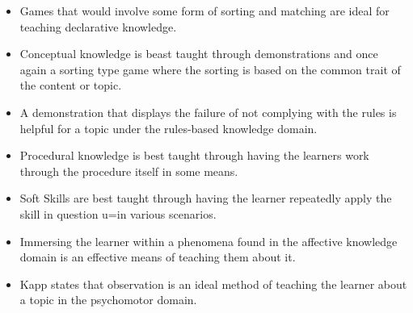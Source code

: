 \documentclass[conference]{IEEEtran}
\begin{document}
\begin{itemize}
\item
Games that would involve some form of sorting and matching are ideal for teaching declarative knowledge.
\item
Conceptual knowledge is beast taught through demonstrations and once again a sorting type game where the sorting is based on the common trait of the content or topic.
\item
A demonstration that displays the failure of not complying with the rules is helpful for a topic under the rules-based knowledge domain.
\item
Procedural knowledge is best taught through having the learners work through the procedure itself in some means.
\item
Soft Skills are best taught through having the learner repeatedly apply the skill in question u=in various scenarios.
\item
Immersing the learner within a phenomena found in the affective knowledge domain is an effective means of teaching them about it.
\item
Kapp\cite{Kapp2012a} states that observation is an ideal method of teaching the learner about a topic in the psychomotor domain.
\end{itemize}
\end{document}
